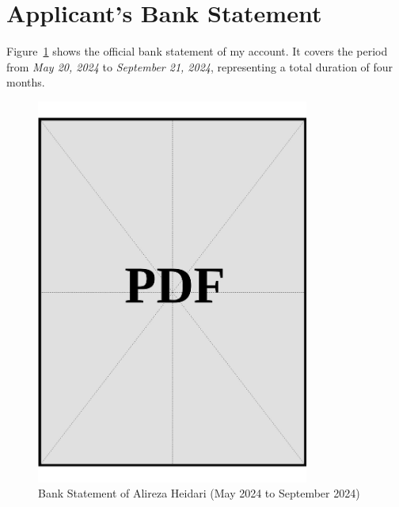 \clearpage

\section{Applicant's Bank Statement}
\label{sec:applicant-bank-statement}

\noindent
Figure~\ref{fig:applicant-bank-statement} shows the official bank statement of my account. It covers the period from \textit{May 20, 2024} to \textit{September 21, 2024}, representing a total duration of four months.

\vspace*{\fill}
\begin{figure}[h]
    \centering
    \includegraphics[page=1, width=0.8\textwidth]{../docs/applicant/funds/bank-account/bank-statement.pdf}
    \caption{Bank Statement of Alireza Heidari (May 2024 to September 2024)}
    \label{fig:applicant-bank-statement}
\end{figure}
\vspace*{\fill}

\clearpage
